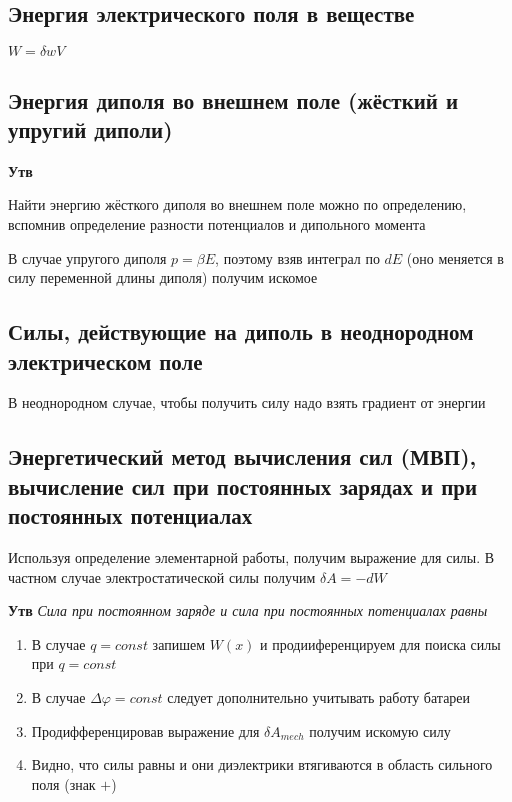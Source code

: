 \documentclass[a4paper, 14pt]{article}
\begin{document}
    \subsection{Энергия электрического поля в веществе}
    
    $W = \delta w V$
    
    \subsection{Энергия диполя во внешнем поле (жёсткий и упругий диполи)}
    
    \textbf{Утв} \textit{}
    
    Найти энергию жёсткого диполя во внешнем поле можно по определению, вспомнив определение разности потенциалов и
    дипольного момента
    
    В случае упругого диполя $p = \beta E$, поэтому взяв интеграл по $dE$ (оно меняется в силу переменной длины
    диполя) получим искомое
    
    \subsection{Силы, действующие на диполь в неоднородном электрическом поле}
    
    В неоднородном случае, чтобы получить силу надо взять градиент от энергии
    
    \subsection{Энергетический метод вычисления сил (МВП), вычисление сил при постоянных зарядах и при постоянных
    потенциалах}
    
    Используя определение элементарной работы, получим выражение для силы.
    В частном случае электростатической силы получим $\delta A = - dW$
    
    \textbf{Утв} \textit{Сила при постоянном заряде и сила при постоянных потенциалах равны}
    
    \begin{enumerate}
        \item В случае $q = const$ запишем $W(x)$ и продииференцируем для поиска силы при $q = const$
        \item В случае $\Delta \varphi = const$ следует дополнительно учитывать работу батареи
        \item Продифференцировав выражение для $\delta A_{mech}$ получим искомую силу
        \item Видно, что силы равны и они диэлектрики втягиваются в область сильного поля (знак $+$)
    \end{enumerate}
    
\end{document}
